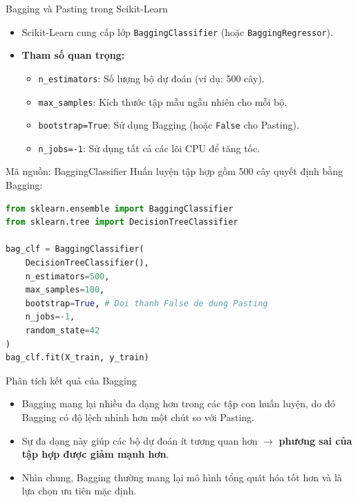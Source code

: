\documentclass[aspectratio=169]{beamer}
\begin{document}
\begin{frame}{Bagging và Pasting trong Scikit-Learn}
    \begin{itemize}
        \item Scikit-Learn cung cấp lớp \texttt{BaggingClassifier} (hoặc \texttt{BaggingRegressor}).
        \item \textbf{Tham số quan trọng:}
            \begin{itemize}
                \item \texttt{n\_estimators}: Số lượng bộ dự đoán (ví dụ: 500 cây).
                \item \texttt{max\_samples}: Kích thước tập mẫu ngẫu nhiên cho mỗi bộ.
                \item \texttt{bootstrap=True}: Sử dụng Bagging (hoặc \texttt{False} cho Pasting).
                \item \texttt{n\_jobs=-1}: Sử dụng tất cả các lõi CPU để tăng tốc.
            \end{itemize}
    \end{itemize}
\end{frame}

\begin{frame}[fragile]{Mã nguồn: BaggingClassifier}
    Huấn luyện tập hợp gồm 500 cây quyết định bằng Bagging:
    \begin{lstlisting}[language=Python]
from sklearn.ensemble import BaggingClassifier
from sklearn.tree import DecisionTreeClassifier

bag_clf = BaggingClassifier(
    DecisionTreeClassifier(),
    n_estimators=500,
    max_samples=100,
    bootstrap=True, # Doi thanh False de dung Pasting
    n_jobs=-1, 
    random_state=42
)
bag_clf.fit(X_train, y_train)
    \end{lstlisting}
\end{frame}

\begin{frame}{Phân tích kết quả của Bagging}
    \begin{itemize}
        \item Bagging mang lại nhiều đa dạng hơn trong các tập con huấn luyện, do đó Bagging có độ lệch nhỉnh hơn một chút so với Pasting.
        \item Sự đa dạng này giúp các bộ dự đoán ít tương quan hơn $\rightarrow$ \textbf{phương sai của tập hợp được giảm mạnh hơn}.
        \item Nhìn chung, Bagging thường mang lại mô hình tổng quát hóa tốt hơn và là lựa chọn ưu tiên mặc định.
    \end{itemize}
\end{frame}
\end{document}
